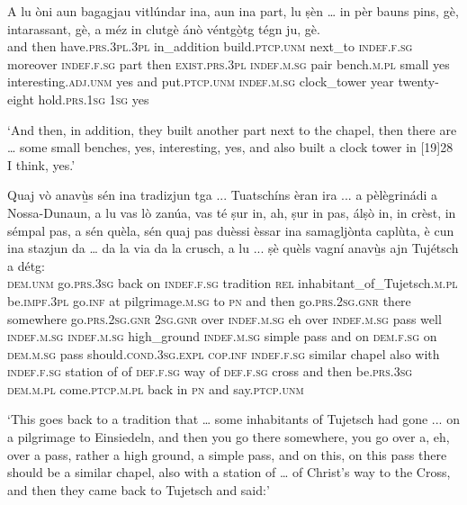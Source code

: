 \begin{linenumbers}
\gll  A lu òni aun bagagjau vitlúndar ina, aun ina part, lu ṣèn … in pèr bauns pins, gè, intarassant, gè, a méz in clutgè ánò véntgò̱tg tégn ju, gè.  \\
and then have.\textsc{prs.3pl}.\textsc{3pl} in\_addition build.\textsc{ptcp.unm} next\_to \textsc{indef.f.sg} moreover \textsc{indef.f.sg} part then \textsc{exist.prs.3pl} {} \textsc{indef.m.sg} pair bench.\textsc{m.pl} small yes interesting.\textsc{adj.unm} yes and put.\textsc{ptcp.unm} \textsc{indef.m.sg} clock\_tower year twenty-eight hold.\textsc{prs.1sg} \textsc{1sg} yes \\
\end{linenumbers} 
\medskip
\glt `And then, in addition, they built another part next to the chapel, then there are … some small benches, yes, interesting, yes, and also built a clock tower in [19]28 I think, yes.'
\medskip

\begin{linenumbers}
\gll   Quaj vò anavù̱s sén ina tradizjun tga ... Tuatschíns èran ira\footnotemark{} ... a pèlègrinádi a Nossa-Dunaun, a lu vas lò zanúa, vas té ṣur in, ah, ṣur in pas, álṣò in, in crèst, in sémpal pas, a sén quèla, sén quaj pas duèssi èssar ina samagljònta caplùta, è cun ina stazjun da … da la via da la crusch, a lu ... ṣè quèls vagní anavù̱s ajn Tujétsch a détg: \\
 \textsc{dem.unm} go.\textsc{prs.3sg} back on \textsc{indef.f.sg} tradition \textsc{rel} {} inhabitant\_of\_Tujetsch.\textsc{m.pl} be.\textsc{impf.3pl} go.\textsc{inf} {} at pilgrimage.\textsc{m.sg} to \textsc{pn} and then go.\textsc{prs.2sg.gnr} there somewhere go.\textsc{prs.2sg.gnr} \textsc{2sg.gnr} over  \textsc{indef.m.sg} eh over \textsc{indef.m.sg} pass well \textsc{indef.m.sg} \textsc{indef.m.sg} high\_ground \textsc{indef.m.sg} simple pass and on \textsc{dem.f.sg} on \textsc{dem.m.sg} pass should.\textsc{cond.3sg.expl} \textsc{cop.inf} \textsc{indef.f.sg} similar chapel also with \textsc{indef.f.sg} station of {} of  \textsc{def.f.sg} way of \textsc{def.f.sg} cross and then {} be.\textsc{prs.3sg} \textsc{dem.m.pl} come.\textsc{ptcp.m.pl} back in \textsc{pn} and say.\textsc{ptcp.unm}  \\
\end{linenumbers}
\medskip
\glt `This goes back to a tradition that … some inhabitants of Tujetsch had gone ... on a pilgrimage to Einsiedeln, and then you go there somewhere, you go over a, eh, over a pass, rather a high ground, a simple pass, and on this, on this pass there should be a similar chapel, also with a station of … of Christ’s way to the Cross, and then they came back to Tujetsch and said:'
\medskip

